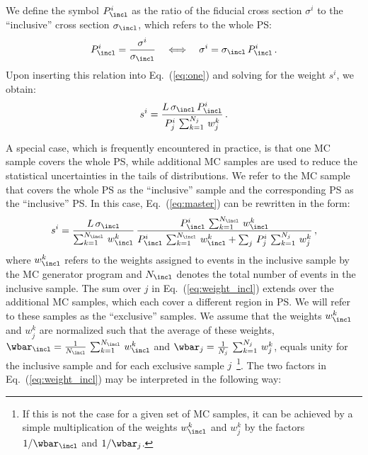 We define the symbol $P_{\incl}^{i}$ as the ratio of the fiducial cross section $\sigma^{i}$ to the ``inclusive'' cross section $\sigma_{\incl}$,
which refers to the whole PS:
\begin{equation*}
P_{\incl}^{i} = \frac{\sigma^{i}}{\sigma_{\incl}} \quad \Longleftrightarrow \quad \sigma^{i} = \sigma_{\incl} \, P_{\incl}^{i} \, .
\label{eq:two}
\end{equation*}
Upon inserting this relation into Eq.~(\ref{eq:one}) and solving for the weight $s^{i}$, we obtain:
\begin{equation}
s^{i} = \frac{L \, \sigma_{\incl} \, P_{\incl}^{i}}{P_{j}^{i} \, \sum_{k=1}^{N_{j}} \, w_{j}^{k}} \, .
\label{eq:master}
\end{equation}

A special case, which is frequently encountered in practice,
is that one MC sample covers the whole PS,
while additional MC samples are used to reduce the statistical uncertainties in the tails of distributions.
We refer to the MC sample that covers the whole PS as the ``inclusive'' sample and the corresponding PS as the ``inclusive'' PS.
In this case, Eq.~(\ref{eq:master}) can be rewritten in the form:
\begin{equation}
s^{i} = \frac{L \, \sigma_{\incl}}{\sum_{k=1}^{N_{\incl}} \, w_{\incl}^{k}} \, \frac{P_{\incl}^{i} \, \sum_{k=1}^{N_{\incl}} \, w_{\incl}^{k}}{P_{\incl}^{i} \, \sum_{k=1}^{N_{\incl}} \, w_{\incl}^{k} + \sum_{j} \, P_{j}^{i} \, \sum_{k=1}^{N_{j}} \, w_{j}^{k}} \, ,
\label{eq:weight_incl}
\end{equation}
where $w_{\incl}^{k}$ refers to the weights assigned to events in the inclusive sample by the MC generator program and $N_{\incl}$ denotes the total number of events in the inclusive sample.
The sum over $j$ in Eq.~(\ref{eq:weight_incl}) extends over the additional MC samples, which each cover a different region in PS.
We will refer to these samples as the ``exclusive'' samples.
We assume that the weights $w_{\incl}^{k}$ and $w_{j}^{k}$ are normalized such that the average of these weights,
$\wbar_{\incl} = \frac{1}{N_{\incl}} \, \sum_{k=1}^{N_{\incl}} \, w_{\incl}^{k}$ and $\wbar_{j} = \frac{1}{N_{j}} \, \sum_{k=1}^{N_{j}} \, w_{j}^{k}$,
equals unity for the inclusive sample and for each exclusive sample $j$~\footnote{
  If this is not the case for a given set of MC samples,
  it can be achieved by a simple multiplication of the weights $w_{\incl}^{k}$ and $w_{j}^{k}$ by the factors $1/\wbar_{\incl}$ and $1/\wbar_{j}$.
}.
The two factors in Eq.~(\ref{eq:weight_incl}) may be interpreted in the following way:
